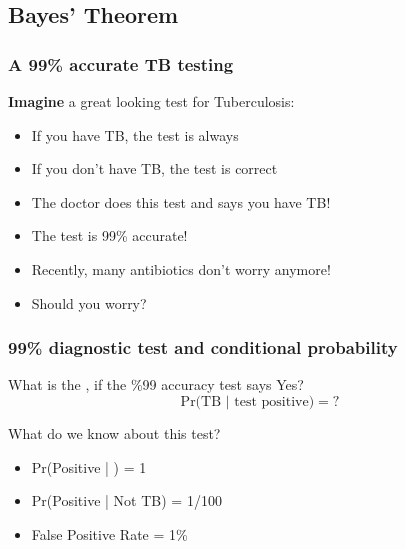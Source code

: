 \documentclass{beamer}
\begin{document}
\subsection{Bayes' Theorem}
\begin{frame}
  \frametitle{A 99\% accurate TB testing}

  {\alert

    {\bf Imagine} a great looking test for Tuberculosis:
    \begin{itemize}
    \item If you \alert{have TB}, the test is always 
    \item If you \alert{don't have TB}, the test is correct 
      \bigskip

    \item<2-> The doctor does this test \alert{and says you have TB!}
    \item<2-> The test is 99\% accurate!
    \item<2-> Recently, many antibiotics don't worry anymore!
      \bigskip

    \item<3> Should you worry?      
    \end{itemize}
  }
\end{frame}

\begin{frame}
  \frametitle{99\% diagnostic test and conditional probability}

  {\large

    What is the , if the \%99
    accuracy test says \alert{Yes}?
    \begin{equation*}
      \text{Pr(TB | test positive)} = ?
    \end{equation*}

    \bigskip

    What do we know about this test?
    \begin{itemize}
    \item<2-> Pr(Positive | ) = 1
    \item<2-> Pr(Positive | \alert{Not TB}) = 1/100
      \bigskip

    \item<3-> \alert{False Positive Rate} = 1\%
    \end{itemize}
  }
\end{frame}
\end{document}
